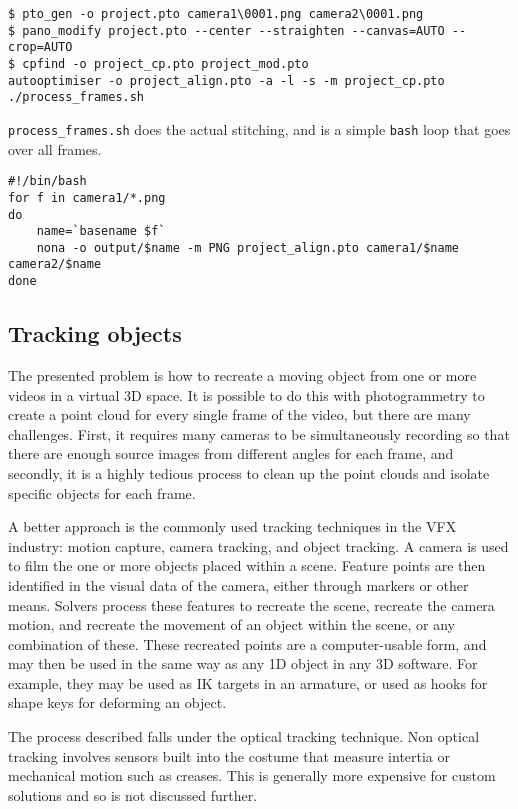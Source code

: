 \begin{lstlisting}
$ pto_gen -o project.pto camera1\0001.png camera2\0001.png
$ pano_modify project.pto --center --straighten --canvas=AUTO --crop=AUTO
$ cpfind -o project_cp.pto project_mod.pto
autooptimiser -o project_align.pto -a -l -s -m project_cp.pto
./process_frames.sh
\end{lstlisting}

{\tt process\_frames.sh} does the actual stitching, and is a simple {\tt bash} loop that goes over all frames.

\begin{lstlisting}
#!/bin/bash
for f in camera1/*.png
do
    name=`basename $f`
    nona -o output/$name -m PNG project_align.pto camera1/$name camera2/$name
done
\end{lstlisting}

\subsection{Tracking objects}

The presented problem is how to recreate a moving object from one or more videos in a virtual 3D space. It is possible to do this with photogrammetry to create a point cloud for every single frame of the video, but there are many challenges. First, it requires many cameras to be simultaneously recording so that there are enough source images from different angles for each frame, and secondly, it is a highly tedious process to clean up the point clouds and isolate specific objects for each frame.

A better approach is the commonly used tracking techniques in the VFX industry: motion capture, camera tracking, and object tracking. A camera is used to film the one or more objects placed within a scene. Feature points are then identified in the visual data of the camera, either through markers or other means. Solvers process these features to recreate the scene, recreate the camera motion, and recreate the movement of an object within the scene, or any combination of these. These recreated points are a computer-usable form, and may then be used in the same way as any 1D object in any 3D software. For example, they may be used as IK targets in an armature, or used as hooks for shape keys for deforming an object.

The process described falls under the optical tracking technique. Non optical tracking involves sensors built into the costume that measure intertia or mechanical motion such as creases. This is generally more expensive for custom solutions and so is not discussed further.

